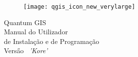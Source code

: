 
\begin{titlepage}
\begin{center}

\begin{figure}[H]
\begin{center}
\texttt{[image: qgis\_icon\_new\_verylarge]} 
\end{center}
\end{figure}

\Huge{Quantum GIS}\\
\vspace{0.5cm}
\Large{Manual do Utilizador \\ de Instala\c{c}\~{a}o e de Programa\c{c}\~{a}o}\\
\vspace{0.5cm}
\Large{Vers\H{a}o ~\CURRENT \textsl{'Kore'}}

\end{center}
\end{titlepage}
